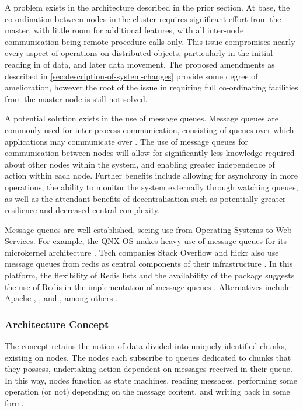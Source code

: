 A problem exists in the architecture described in the prior section.
At base, the co-ordination between nodes in the cluster requires significant effort from the master, with little room for additional features, with all inter-node communication being remote procedure calls only.
This issue compromises nearly every aspect of operations on distributed objects, particularly in the initial reading in of data, and later data movement.
The proposed amendments as described in \cref{sec:description-of-system-changes} provide some degree of amelioration, however the root of the issue in requiring full co-ordinating facilities from the master node is still not solved.

A potential solution exists in the use of message queues.
Message queues are commonly used for inter-process communication, consisting of queues over which applications may communicate over \cite{curry2004message}.
The use of message queues for communication between nodes will allow for significantly less knowledge required about other nodes within the system, and enabling greater independence of action within each node.
Further benefits include allowing for asynchrony in more operations, the ability to monitor the system externally through watching queues, as well as the attendant benefits of decentralisation such as potentially greater resilience and decreased central complexity.

Message queues are well established, seeing use from Operating Systems to Web Services.
For example, the QNX OS makes heavy use of message queues for its microkernel architecture \cite{hildebrand1992qnx}.
Tech companies Stack Overflow and flickr also use message queues from redis as central components of their infrastructure \cites{nolan2011flickr,montrose2016stack}.
In this platform, the flexibility of Redis lists and the availability of the  package suggests the use of Redis in the implementation of message queues \cite{sanfilippo2009redis,urbanek2020rediscc}.
Alternatives include Apache , , and , among others \cites{snyder2011activemq,garg2013kafka,sanfilippo2016disque}.

\subsubsection{Architecture Concept}\label{architecture-concept}

The concept retains the notion of data divided into uniquely identified chunks, existing on nodes.
The nodes each subscribe to queues dedicated to chunks that they possess, undertaking action dependent on messages received in their queue.
In this way, nodes function as state machines, reading messages, performing some operation (or not) depending on the message content, and writing back in some form.

